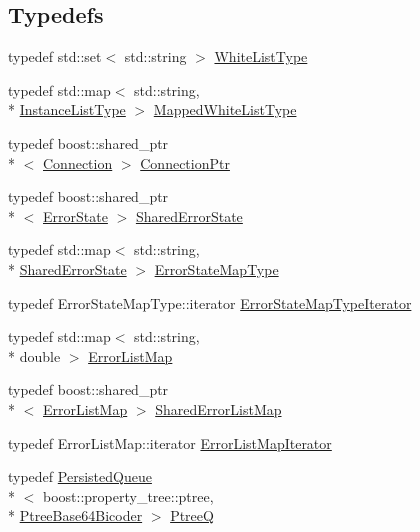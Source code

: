 \subsection*{Typedefs}
\begin{DoxyCompactItemize}
\item 
typedef std\-::set$<$ std\-::string $>$ \hyperlink{a00089_a6aa00ccbe46e3a892fa90d3fbf6e3439}{White\-List\-Type}
\item 
typedef std\-::map$<$ std\-::string, \\*
\hyperlink{a00028}{Instance\-List\-Type} $>$ \hyperlink{a00089_a33979b59a2b404e85c9416071d843412}{Mapped\-White\-List\-Type}
\item 
typedef boost\-::shared\-\_\-ptr\\*
$<$ \hyperlink{a00022}{Connection} $>$ \hyperlink{a00089_a4632e92aebdc8fa1c220da260469cbb2}{Connection\-Ptr}
\item 
typedef boost\-::shared\-\_\-ptr\\*
$<$ \hyperlink{a00024}{Error\-State} $>$ \hyperlink{a00089_af77de115307b379cbcab83a1fc54fdad}{Shared\-Error\-State}
\item 
typedef std\-::map$<$ std\-::string, \\*
\hyperlink{a00089_af77de115307b379cbcab83a1fc54fdad}{Shared\-Error\-State} $>$ \hyperlink{a00089_ab99725cc511536c050d9cab582313d0c}{Error\-State\-Map\-Type}
\item 
typedef Error\-State\-Map\-Type\-::iterator \hyperlink{a00089_a37b3f68e4626dc05d9d2381803a889b4}{Error\-State\-Map\-Type\-Iterator}
\item 
typedef std\-::map$<$ std\-::string, \\*
double $>$ \hyperlink{a00089_a325b559f17774bf1155d5dda8fe335e3}{Error\-List\-Map}
\item 
typedef boost\-::shared\-\_\-ptr\\*
$<$ \hyperlink{a00089_a325b559f17774bf1155d5dda8fe335e3}{Error\-List\-Map} $>$ \hyperlink{a00089_a52b7a11959a119c1da931042d7751db0}{Shared\-Error\-List\-Map}
\item 
typedef Error\-List\-Map\-::iterator \hyperlink{a00089_a5493eddaf40e71c5f85672b1ab37afcb}{Error\-List\-Map\-Iterator}
\item 
typedef \hyperlink{a00035}{Persisted\-Queue}\\*
$<$ boost\-::property\-\_\-tree\-::ptree, \\*
\hyperlink{a00036}{Ptree\-Base64\-Bicoder} $>$ \hyperlink{a00089_af1d6724570f46ac378171bd45ddf6903}{Ptree\-Q}
\item 

\end{DoxyCompactItemize}
